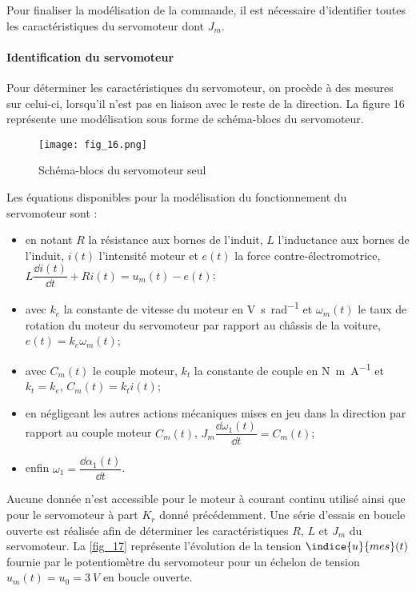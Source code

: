 \ifprof
\begin{corrige}
\end{corrige}
\else
\fi

Pour finaliser la modélisation de la commande, il est nécessaire d’identifier toutes les caractéristiques du servomoteur dont $J_m$.

\paragraph{Identification du servomoteur}

Pour déterminer les caractéristiques du servomoteur, on procède à des mesures sur celui-ci, lorsqu’il n’est pas
en liaison avec le reste de la direction. La figure 16 représente une modélisation sous forme de schéma-blocs du
servomoteur.


\begin{figure}[H]
\centering
\texttt{[image: fig\_16.png]}
\caption{Schéma-blocs du servomoteur seul \label{fig_16}}
\end{figure}

Les équations disponibles pour la modélisation du fonctionnement du servomoteur sont :
\begin{itemize}
\item en notant $R$ la résistance aux bornes de l’induit, $L$ l’inductance aux bornes de l’induit, $i(t)$ l’intensité moteur et $e(t)$ la force contre-électromotrice, $L\dfrac{\dd i(t)}{\dd t} +Ri(t) =u_m(t)-e(t)$;
\item avec $k_e$ la constante de vitesse du moteur en \si{V.s.rad^{-1}} et $\omega_m(t)$ le taux de rotation du moteur du servomoteur par rapport au châssis de la voiture, $e(t)=k_e\omega_m(t)$;
\item avec $C_m(t)$ le couple moteur, $k_t$ la constante de couple en \si{N.m.A^{-1}} et $k_t=k_e$, 
$C_m(t)=k_t i(t)$;
\item en négligeant les autres actions mécaniques mises en jeu dans la direction par rapport au couple moteur
$C_m(t)$, $J_m\dfrac{\dd \omega_1(t)}{\dd t} = C_m(t)$;
\item enfin $\omega_1=\dfrac{\dd \alpha_1(t)}{\dd t}$.
\end{itemize}

Aucune donnée n’est accessible pour le moteur à courant continu utilisé ainsi que pour le servomoteur à part
$K_r$ donné précédemment. Une série d’essais en boucle ouverte est réalisée afin de déterminer les caractéristiques $R$, $L$ et $J_m$ du servomoteur.
La \autoref{fig_17} représente l’évolution de la tension $\indice{u}{mes}(t)$ fournie par le potentiomètre du servomoteur pour un échelon de tension $u_m(t) = u_0 = \SI{3}{V}$ en boucle ouverte.

